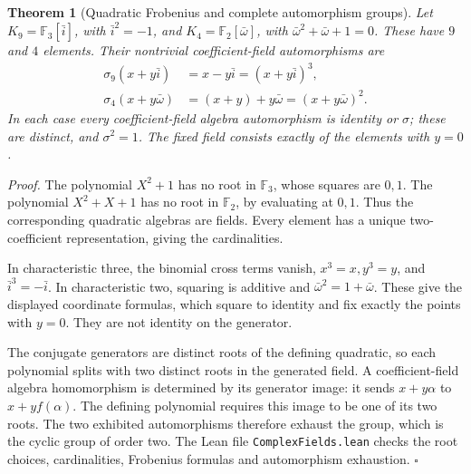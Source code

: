 \documentclass[11pt,letterpaper]{article}
\newtheorem{theorem}{Theorem}
\newenvironment{proof}{\noindent\textit{Proof.}}{\hfill\(\square\)}
\begin{document}
\begin{theorem}[Quadratic Frobenius and complete automorphism groups]
Let \(K_9=\mathbb F_3[\bar i]\), with \(\bar i^2=-1\), and \(K_4=\mathbb F_2[\bar\omega]\), with \(\bar\omega^2+\bar\omega+1=0\). These have \(9\) and \(4\) elements. Their nontrivial coefficient-field automorphisms are
\begin{align*}
\sigma_9(x+y\bar i)&=x-y\bar i=(x+y\bar i)^3,\\
\sigma_4(x+y\bar\omega)&=(x+y)+y\bar\omega=(x+y\bar\omega)^2.
\end{align*}
In each case every coefficient-field algebra automorphism is identity or \(\sigma\); these are distinct, and \(\sigma^2=1\). The fixed field consists exactly of the elements with \(y=0\).
\end{theorem}
\begin{proof}
The polynomial \(X^2+1\) has no root in \(\mathbb F_3\), whose squares are \(0,1\). The polynomial \(X^2+X+1\) has no root in \(\mathbb F_2\), by evaluating at \(0,1\). Thus the corresponding quadratic algebras are fields. Every element has a unique two-coefficient representation, giving the cardinalities.

In characteristic three, the binomial cross terms vanish, \(x^3=x,y^3=y\), and \(\bar i^3=-\bar i\). In characteristic two, squaring is additive and \(\bar\omega^2=1+\bar\omega\). These give the displayed coordinate formulas, which square to identity and fix exactly the points with \(y=0\). They are not identity on the generator.

The conjugate generators are distinct roots of the defining quadratic, so each polynomial splits with two distinct roots in the generated field. A coefficient-field algebra homomorphism is determined by its generator image: it sends \(x+y\alpha\) to \(x+yf(\alpha)\). The defining polynomial requires this image to be one of its two roots. The two exhibited automorphisms therefore exhaust the group, which is the cyclic group of order two. The Lean file \texttt{Complex\allowbreak Fields.lean} checks the root choices, cardinalities, Frobenius formulas and automorphism exhaustion.
\end{proof}
\end{document}
